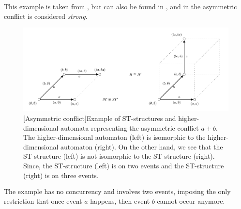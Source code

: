     \begin{example}
        \label{exp:asymmetric-conflict}
        This example is taken from \cite[Example 3.38]{Johansen16STstruct}, but can also be found in \cite[Example 3]{GlabbeekP09configStruct}, and in \cite[page.22]{Pratt03trans_cancel} the asymmetric conflict is considered \emph{strong}. 
    
    
        \begin{figure}[ht]
            \centering
            \includegraphics[scale=0.9]{Figures/4.Relationship-with-other-models-of-concurrency/ST-structure-and-HDA/Asymmetric-conflict.pdf}
            [Asymmetric conflict]{Example of ST-structures and higher-dimensional automata representing the asymmetric conflict $a + b$. The higher-dimensional automaton (left) is isomorphic to the higher-dimensional automaton (right). On the other hand, we see that the ST-structure (left) is not isomorphic to the ST-structure (right). Since, the ST-structure (left) is on two events and the ST-structure (right) is on three events.}
            \label{fig:asymmetric-conflict-st-hda}
        \end{figure}
    
        The example has no concurrency and involves two events, imposing the only restriction that once event $a$ happens, then event $b$ cannot occur anymore. 
    

\end{example}
